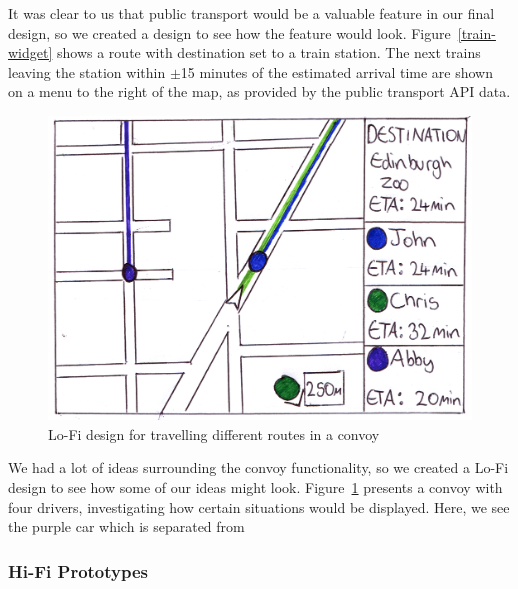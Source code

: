 \documentclass{article}
\begin{document}
It was clear to us that public transport would be a valuable feature in our final design, so we created a design to see how the feature would look. Figure~\ref{train-widget} shows a route with destination set to a train station. The next trains leaving the station within $\pm$15 minutes of the estimated arrival time are shown on a menu to the right of the map, as provided by the public transport API data.
\begin{figure}[H]
  \centering
  \includegraphics[scale=0.5]{convoy-lofi}
  \caption{Lo-Fi design for travelling different routes in a convoy}\label{convoy-lofi}
\end{figure}

We had a lot of ideas surrounding the convoy functionality, so we created a Lo-Fi design to see how some of our ideas might look. Figure~\ref{convoy-lofi} presents a convoy with four drivers, investigating how certain situations would be displayed. Here, we see the purple car which is separated from 

\subsubsection{Hi-Fi Prototypes}
\end{document}
